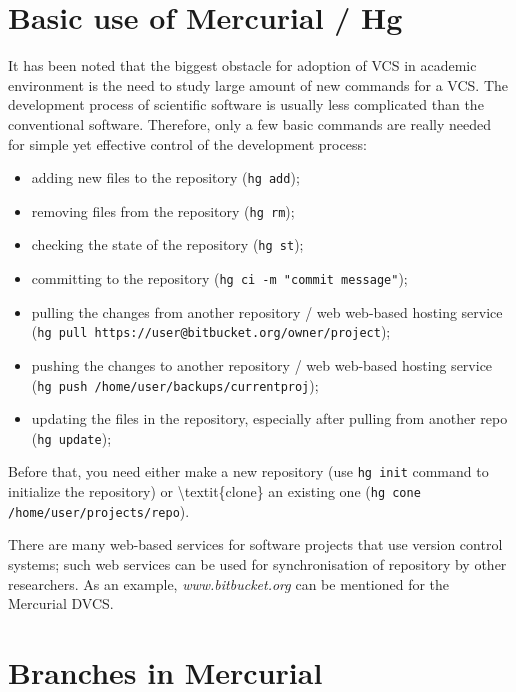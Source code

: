 \section{Basic use of Mercurial / Hg}

It has been noted that the biggest obstacle for adoption of VCS in
academic environment is the need to study large amount of new
commands for a VCS. The development process of scientific software
is usually less complicated than the conventional software.
Therefore, only a few basic commands are really needed for simple
yet effective control of the development process:

\begin{itemize}
\item
  adding new files to the repository (\verb!hg add!);

\item
  removing files from the repository (\verb!hg rm!);

\item
  checking the state of the repository (\verb!hg st!);

\item
  committing to the repository (\verb!hg ci -m "commit message"!);

\item
  pulling the changes from another repository / web web-based hosting
  service\\
  (\verb!hg pull https://user@bitbucket.org/owner/project!);

\item
  pushing the changes to another repository / web web-based hosting
  service\\ (\verb!hg push /home/user/backups/currentproj!);

\item
  updating the files in the repository, especially after pulling from
  another repo (\verb!hg update!);

\end{itemize}
Before that, you need either make a new repository (use
\verb!hg init! command to initialize the repository) or
\textbackslash{}textit\{clone\} an existing one
(\verb!hg cone /home/user/projects/repo!).

There are many web-based services for software projects that use
version control systems; such web services can be used for
synchronisation of repository by other researchers. As an example,
\emph{www.bitbucket.org} can be mentioned for the Mercurial DVCS.

\section{Branches in Mercurial}

